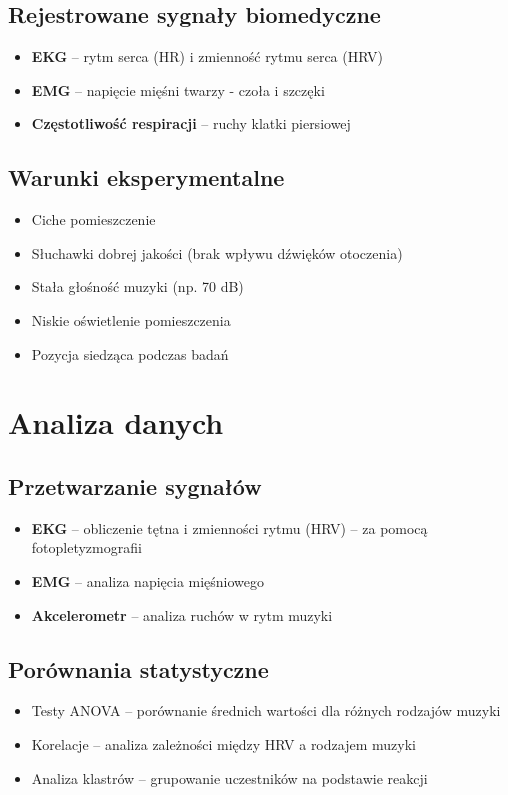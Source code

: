 \documentclass[a4paper,12pt]{article}
\begin{document}
\subsection{Rejestrowane sygnały biomedyczne}
\begin{itemize}
    \item \textbf{EKG} -- rytm serca (HR) i zmienność rytmu serca (HRV)
    \item \textbf{EMG} -- napięcie mięśni twarzy - czoła i szczęki
    \item \textbf{Częstotliwość respiracji} -- ruchy klatki piersiowej
\end{itemize}

\subsection{Warunki eksperymentalne}
\begin{itemize}
    \item Ciche pomieszczenie
    \item Słuchawki dobrej jakości (brak wpływu dźwięków otoczenia)
    \item Stała głośność muzyki (np. 70 dB)
    \item Niskie oświetlenie pomieszczenia
    \item Pozycja siedząca podczas badań
\end{itemize}

\section{Analiza danych}
\subsection{Przetwarzanie sygnałów}
\begin{itemize}
    \item \textbf{EKG} -- obliczenie tętna i zmienności rytmu (HRV) -- za pomocą fotopletyzmografii
    \item \textbf{EMG} -- analiza napięcia mięśniowego
    \item \textbf{Akcelerometr} -- analiza ruchów w rytm muzyki
\end{itemize}

\subsection{Porównania statystyczne}
\begin{itemize}
    \item Testy ANOVA -- porównanie średnich wartości dla różnych rodzajów muzyki
    \item Korelacje -- analiza zależności między HRV a rodzajem muzyki
    \item Analiza klastrów -- grupowanie uczestników na podstawie reakcji
\end{itemize}
\end{document}
